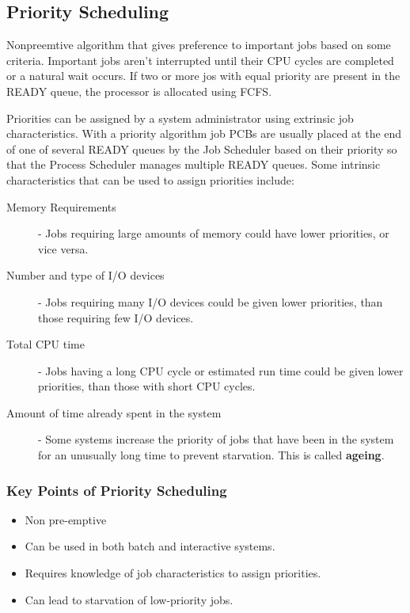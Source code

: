 \documentclass[12pt letter]{report}
\begin{document}
\subsection{Priority Scheduling}

Nonpreemtive algorithm that gives preference to important jobs based
on some criteria. Important jobs aren't interrupted until their CPU
cycles are completed or a natural wait occurs.  If two or more jos
with equal priority are present in the READY queue, the processor is
allocated using FCFS.

Priorities can be assigned by a system administrator using extrinsic job
characteristics. With a priority algorithm job PCBs are usually
placed at the end of one of several READY queues by the Job Scheduler
based on their priority so that the Process Scheduler manages
multiple READY queues. Some intrinsic characteristics that can be
used to assign priorities include:
\begin{description}
  \item[Memory Requirements]  - Jobs requiring large amounts of
    memory could have lower priorities, or vice versa.
  \item[Number and type of I/O devices] - Jobs requiring many I/O
    devices could be given lower priorities, than those requiring few
    I/O devices.
  \item[Total CPU time] - Jobs having a long CPU cycle or estimated
    run time could be given lower priorities, than those with short CPU cycles.
  \item[Amount of time already spent in the system] - Some systems
    increase the priority of jobs that have been in the system for an
    unusually long time to prevent starvation. This is called \textbf{ageing}.
\end{description}

\subsubsection{Key Points of Priority Scheduling}
\begin{itemize}
  \item Non pre-emptive
  \item Can be used in both batch and interactive systems.
  \item Requires knowledge of job characteristics to assign priorities.
  \item Can lead to starvation of low-priority jobs.
\end{itemize}
\end{document}
